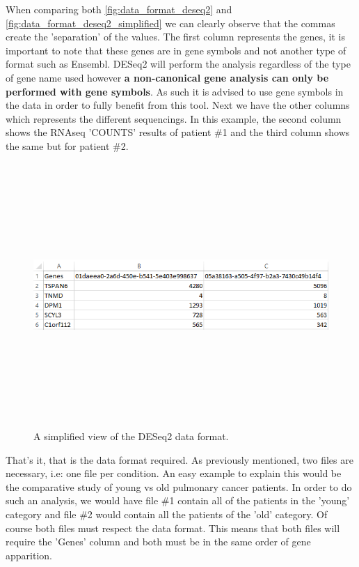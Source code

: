 \documentclass[11pt]{article}
\begin{document}
When comparing both \autoref{fig:data_format_deseq2} and \autoref{fig:data_format_deseq2_simplified} we can clearly observe that the commas create the 'separation' of the values. 
The first column represents the genes, it is important to note that these genes are in gene symbols and not another type of format such as Ensembl. DESeq2 will perform the analysis regardless of the type of gene name used however \textbf{a non-canonical gene analysis can only be performed with gene symbols}. As such it is advised to use gene symbols in the data in order to fully benefit from this tool. Next we have the other columns which represents the different sequencings. In this example, the second column shows the RNAseq 'COUNTS' results of patient \#1 and the third column shows the same but for patient \#2.
\begin{figure}[h!]
\centering
\includegraphics[width=15cm,height=10cm,keepaspectratio]{dese2_excel_data_format.png}
\caption{A simplified view of the DESeq2 data format.}
\label{fig:data_format_deseq2_simplified}
\end{figure}

That's it, that is the data format required. As previously mentioned, two files are necessary, i.e: one file per condition. An easy example to explain this would be the comparative study of young vs old pulmonary cancer patients. In order to do such an analysis, we would have file \#1 contain all of the patients in the 'young' category and file \#2 would contain all the patients of the 'old' category. Of course both files must respect the data format. This means that both files will require the 'Genes' column and both must be in the same order of gene apparition.
\end{document}
